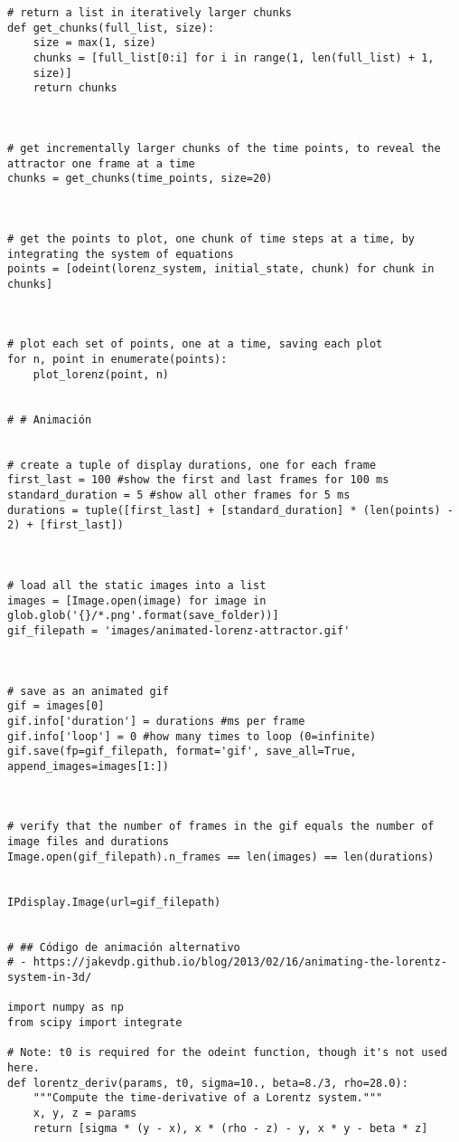 \begin{verbatim}
# return a list in iteratively larger chunks
def get_chunks(full_list, size):
    size = max(1, size)
    chunks = [full_list[0:i] for i in range(1, len(full_list) + 1, 
    size)]
    return chunks



# get incrementally larger chunks of the time points, to reveal the 
attractor one frame at a time
chunks = get_chunks(time_points, size=20)



# get the points to plot, one chunk of time steps at a time, by 
integrating the system of equations
points = [odeint(lorenz_system, initial_state, chunk) for chunk in 
chunks]



# plot each set of points, one at a time, saving each plot
for n, point in enumerate(points):
    plot_lorenz(point, n)


# # Animación


# create a tuple of display durations, one for each frame
first_last = 100 #show the first and last frames for 100 ms
standard_duration = 5 #show all other frames for 5 ms
durations = tuple([first_last] + [standard_duration] * (len(points) - 
2) + [first_last])



# load all the static images into a list
images = [Image.open(image) for image in 
glob.glob('{}/*.png'.format(save_folder))]
gif_filepath = 'images/animated-lorenz-attractor.gif'



# save as an animated gif
gif = images[0]
gif.info['duration'] = durations #ms per frame
gif.info['loop'] = 0 #how many times to loop (0=infinite)
gif.save(fp=gif_filepath, format='gif', save_all=True, 
append_images=images[1:])



# verify that the number of frames in the gif equals the number of 
image files and durations
Image.open(gif_filepath).n_frames == len(images) == len(durations)


IPdisplay.Image(url=gif_filepath)


# ## Código de animación alternativo
# - https://jakevdp.github.io/blog/2013/02/16/animating-the-lorentz-
system-in-3d/

import numpy as np
from scipy import integrate

# Note: t0 is required for the odeint function, though it's not used 
here.
def lorentz_deriv(params, t0, sigma=10., beta=8./3, rho=28.0):
    """Compute the time-derivative of a Lorentz system."""
    x, y, z = params
    return [sigma * (y - x), x * (rho - z) - y, x * y - beta * z]


\end{verbatim}

